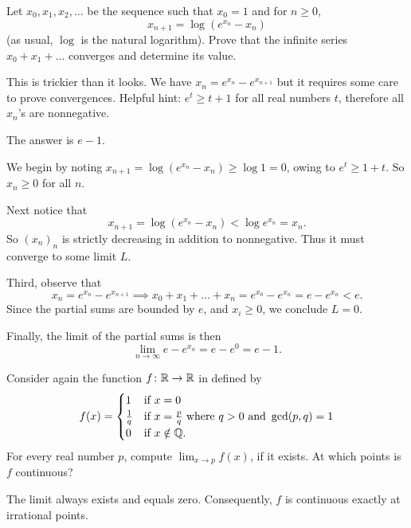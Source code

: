 \begin{problem}
	[Putnam 2016 B1]
	\gim
	Let $x_0, x_1, x_2, \dots$ be the sequence
	such that $x_0=1$ and for $n\ge 0$,
	\[ x_{n+1} = \log(e^{x_n}-x_n) \]
	(as usual, $\log$ is the natural logarithm).
	Prove that the infinite series $x_0 + x_1 + \dots$
	converges and determine its value.
	\begin{hint}
		This is trickier than it looks.
		We have $x_n = e^{x_n} - e^{x_{n+1}}$
		but it requires some care to prove convergences.
		Helpful hint: $e^t \ge t+1$ for all real numbers $t$,
		therefore all $x_n$'s are nonnegative.
	\end{hint}
	\begin{sol}
		The answer is $e-1$.

		We begin by noting $x_{n+1} = \log(e^{x_n} - x_n) \ge \log 1 = 0$,
		owing to $e^t \ge 1+t$.
		So $x_n \ge 0$ for all $n$.

		Next notice that
		\[ x_{n+1} = \log\left( e^{x_n} - x_n \right) < \log e^{x_n} = x_n. \]
		So $(x_n)_n$ is strictly decreasing in addition to nonnegative.
		Thus it must converge to some limit $L$.

		Third, observe that
		\[ x_n = e^{x_n} - e^{x_{n+1}}
			\implies x_0 + x_1 + \dots + x_n
			= e^{x_0} - e^{x_n} = e - e^{x_n} < e. \]
		Since the partial sums are bounded by $e$,
		and $x_i \ge 0$, we conclude $L = 0$.

		Finally, the limit of the partial sums is then
		\[ \lim_{n \to \infty} e - e^{x_n} = e - e^0 = e - 1. \]
	\end{sol}
\end{problem}


\begin{problem}
	Consider again the function $f \colon \mathbb R \to \mathbb R$
	in  defined by
	\[ f(x) = \begin{cases}
			1 & \text{if } x = 0 \\
			\frac1q & \text{if } x = \frac pq
			\text{ where } q > 0 \text{ and } \gcd(p,q) = 1 \\
			0 & \text{if } x \notin \mathbb Q.
		\end{cases} \]
	For every real number $p$,
	compute $\lim_{x \to p} f(x)$, if it exists.
	At which points is $f$ continuous?
	\begin{hint}
		The limit always exists and equals zero.
		Consequently, $f$ is continuous exactly at irrational points.
	\end{hint}
\end{problem}

